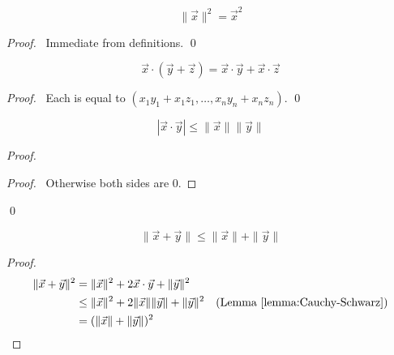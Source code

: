 \begin{lemma}
    \[ \| \vec{x} \|^2 = \vec{x}^2 \]
\end{lemma}

\begin{proof}
    \pf\ Immediate from definitions. \qed
\end{proof}

\begin{lemma}
    \[ \vec{x} \cdot (\vec{y} + \vec{z}) = \vec{x} \cdot \vec{y} + \vec{x} \cdot \vec{z} \]
\end{lemma}

\begin{proof}
    \pf\ Each is equal to $(x_1 y_1 + x_1 z_1, \ldots, x_n y_n + x_n z_n)$. \qed
\end{proof}

\begin{lemma}
    \label{lemma:Cauchy-Schwarz}
    \[ |\vec{x} \cdot \vec{y}| \leq \| \vec{x} \| \| \vec{y} \| \]
\end{lemma}

\begin{proof}
    \pf
    \begin{proof}
        \pf\ Otherwise both sides are 0.
    \end{proof}
    \qed
\end{proof}

\begin{lemma}
    \label{lemma:triangle_inequality}
    \[ \| \vec{x} + \vec{y} \| \leq \| \vec{x} \| + \| \vec{y} \| \]
\end{lemma}

\begin{proof}
    \pf
    \begin{align*}
        \| \vec{x} + \vec{y} \|^2 & = \| \vec{x} \|^2 + 2 \vec{x} \cdot \vec{y} + \| \vec{y} \|^2 \\
        & \leq \| \vec{x} \|^2 + 2 \| \vec{x} \| \| \vec{y} \| + \| \vec{y} \|^2 & (\text{Lemma \ref{lemma:Cauchy-Schwarz}}) \\
        & = (\| \vec{x} \| + \| \vec{y} \|)^2 & \qed
    \end{align*}
\end{proof}


